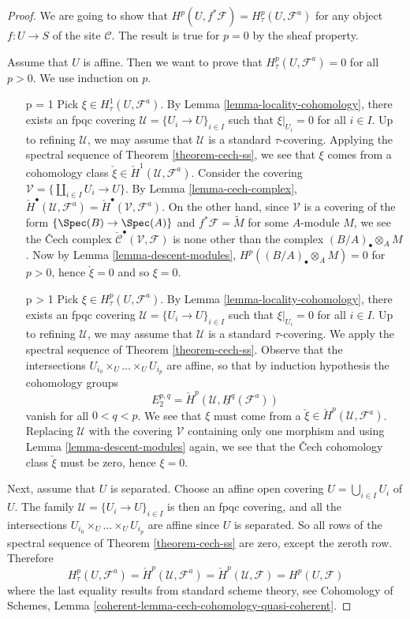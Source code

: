 \begin{proof}
We are going to show that
$H^p(U, f^*\mathcal{F}) = H^p_\tau(U, \mathcal{F}^a)$
for any object $f : U \to S$ of the site $\mathcal{C}$.
The result is true for $p = 0$ by the sheaf property.

\medskip\noindent
Assume that $U$ is affine. Then we want to prove that
$H^p_\tau(U, \mathcal{F}^a) = 0$ for all $p > 0$. We use induction on $p$.
\begin{enumerate}
\item[p = 1]
Pick $\xi \in H^1_\tau(U, \mathcal{F}^a)$.
By Lemma \ref{lemma-locality-cohomology},
there exists an fpqc covering $\mathcal{U} = \{U_i \to U\}_{i \in I}$
such that $\xi|_{U_i} = 0$ for all $i \in I$. Up to refining
$\mathcal{U}$, we may assume that $\mathcal{U}$ is a standard
$\tau$-covering. Applying the spectral sequence of
Theorem \ref{theorem-cech-ss},
we see that $\xi$ comes from a cohomology class
$\check \xi \in \check H^1(\mathcal{U}, \mathcal{F}^a)$.
Consider the covering $\mathcal{V} = \{\coprod_{i\in I} U_i \to U\}$. By
Lemma \ref{lemma-cech-complex},
$\check H^\bullet(\mathcal{U}, \mathcal{F}^a) =
\check H^\bullet(\mathcal{V}, \mathcal{F}^a)$.
On the other hand, since $\mathcal{V}$ is a covering of the form
$\{\Spec(B) \to \Spec(A)\}$ and $f^*\mathcal{F} = \widetilde{M}$
for some $A$-module $M$, we see the {\v C}ech complex
$\check{\mathcal{C}}^\bullet(\mathcal{V}, \mathcal{F})$
is none other than the complex $(B/A)_\bullet \otimes_A M$.
Now by Lemma \ref{lemma-descent-modules},
$H^p((B/A)_\bullet \otimes_A M) = 0$ for $p>0$, hence $\check \xi = 0$
and so $\xi = 0$.
\item[p > 1]
Pick $\xi \in H^p_\tau(U, \mathcal{F}^a)$. By
Lemma \ref{lemma-locality-cohomology},
there exists an fpqc covering $\mathcal{U} = \{U_i \to U\}_{i \in I}$
such that $\xi|_{U_i} = 0$ for all $i \in I$. Up to refining
$\mathcal{U}$, we may assume that $\mathcal{U}$ is a standard
$\tau$-covering. We apply the spectral sequence of
Theorem \ref{theorem-cech-ss}.
Observe that the intersections $U_{i_0} \times_U \ldots \times_U U_{i_p}$
are affine, so that by induction hypothesis the cohomology groups
$$
E_2^{p, q} = \check H^p(\mathcal{U}, \underline{H}^q(\mathcal{F}^a))
$$
vanish for all $0 < q < p$. We see that $\xi$ must come from a
$\check \xi \in \check H^p(\mathcal{U}, \mathcal{F}^a)$. Replacing
$\mathcal{U}$ with the covering $\mathcal{V}$ containing only one morphism
and using Lemma \ref{lemma-descent-modules} again,
we see that the {\v C}ech cohomology class $\check \xi$ must be zero,
hence $\xi = 0$.
\end{enumerate}
Next, assume that $U$ is separated. Choose an affine open covering
$U = \bigcup_{i \in I} U_i$ of $U$. The family
$\mathcal{U} = \{U_i \to U\}_{i \in I}$ is then an fpqc covering,
and all the intersections
$U_{i_0} \times_U \ldots \times_U U_{i_p}$ are affine
since $U$ is separated. So all rows of the spectral sequence of
Theorem \ref{theorem-cech-ss}
are zero, except the zeroth row. Therefore
$$
H^p_\tau(U, \mathcal{F}^a) =
\check H^p(\mathcal{U}, \mathcal{F}^a) =
\check H^p(\mathcal{U}, \mathcal{F}) = H^p(U, \mathcal{F})
$$
where the last equality results from standard scheme theory, see
Cohomology of Schemes, Lemma
\ref{coherent-lemma-cech-cohomology-quasi-coherent}.


\end{proof}
